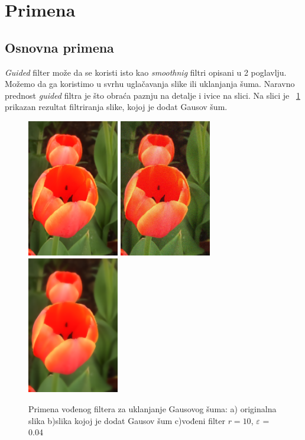 \documentclass[a4paper,12pt,titlepage]{article}
\begin{document}
\section{Primena}%

\subsection{Osnovna primena}%

\emph{Guided} filter može da se koristi isto kao \emph{smoothnig} filtri opisani u 2 poglavlju. Možemo da ga koristimo u svrhu uglačavanja slike ili uklanjanja šuma. Naravno prednost \emph{guided} filtra je što obraća paznju na detalje i ivice na slici. Na slici je ~\ref{flowerGF} prikazan rezultat filtriranja slike, kojoj je dodat Gausov šum.

\begin{figure}[ht!]
\centering
\includegraphics[width=40mm]{img/flower.png}
\includegraphics[width=40mm]{img/flowerNoise.png}
\includegraphics[width=40mm]{img/flowerGF.png}
\caption{Primena vođenog filtera za uklanjanje Gausovog šuma: a) originalna slika b)slika kojoj je dodat Gausov šum c)vođeni filter $r = 10$, $\varepsilon$ = 0.04 }
\label{flowerGF}
\end{figure}
\end{document}
